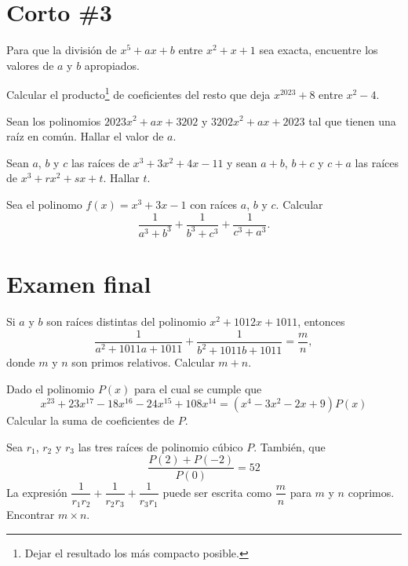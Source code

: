 


\section{Corto \#3}

\begin{problem}
    Para que la división de $x^5 + ax + b$ entre $x^2 + x + 1$ sea exacta, encuentre los valores de $a$ y $b$ apropiados.
\end{problem}

\begin{problem}
    Calcular el producto\footnote{Dejar el resultado los más compacto posible.} de coeficientes del resto que deja $x^{2023} + 8$ entre $x^2 - 4$.
\end{problem}

\begin{problem}
    Sean los polinomios $2023x^2 + ax + 3202$ y $3202x^2 + ax + 2023$ tal que tienen una raíz en común.
    Hallar el valor de $a$.
\end{problem}

\begin{problem}
    Sean $a$, $b$ y $c$ las raíces de $x^3 + 3x^2 + 4x - 11$ y sean $a + b$, $b + c$ y $c + a$ las raíces de $x^3 + rx^2 + sx + t$.
    Hallar $t$.
\end{problem}

\begin{problem}
    Sea el polinomo $f(x) = x^3 + 3x - 1$ con raíces $a$, $b$ y $c$.
    Calcular
    \[\frac{1}{a^3 + b^3} + \frac{1}{b^3 + c^3} + \frac{1}{c^3 + a^3}.\]
\end{problem}


\section{Examen final}

\begin{problem}
    Si $a$ y $b$ son raíces distintas del polinomio $x^2 + 1012x + 1011$, entonces
    \[\frac{1}{a^2 + 1011a + 1011} + \frac{1}{b^2 + 1011b + 1011} = \frac{m}{n},\]
    donde $m$ y $n$ son primos relativos.
    Calcular $m + n$.
\end{problem}

\begin{problem}
    Dado el polinomio $P(x)$ para el cual se cumple que
    \[x^{23} + 23x^{17} - 18x^{16} - 24x^{15} + 108x^{14} = (x^4 - 3x^2 - 2x + 9)P(x)\]
    Calcular la suma de coeficientes de $P$.
\end{problem}

\begin{problem}
    Sea $r_1$, $r_2$ y $r_3$ las tres raíces de polinomio cúbico $P$.
    También, que
    \[\frac{P(2) + P(-2)}{P(0)} = 52\]
    La expresión $\dfrac{1}{r_1 r_2} + \dfrac{1}{r_2 r_3} + \dfrac{1}{r_3 r_1}$ puede ser escrita como $\dfrac{m}{n}$ para $m$ y $n$ coprimos.
    Encontrar $m\times n$.
\end{problem}